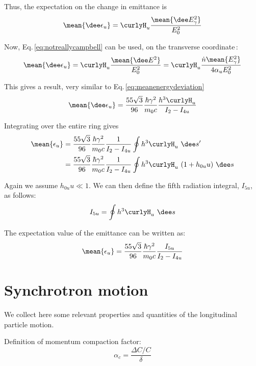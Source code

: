 Thus, the expectation on the change in emittance is
\begin{equation}
    \mean{\dee \epsilon_u} = \curlyH_u \frac{\mean{\dee E_\gamma^2}}{E_0^2}
\end{equation}

Now, Eq.\,\ref{eq:notreallycampbell} can be used, on the transverse coordinate\,\cite{hofmann_2004}:
\begin{equation}
    \mean{\dee \epsilon_u} = \curlyH_u \frac{\mean{\dee E^2}}{E_0^2}
    = \curlyH_u \frac{\dot{n} \mean{E_\gamma^2}}{4 \alpha_u E_0^2}
\end{equation}

This gives a result, very similar to Eq.\,\ref{eq:meanenergydeviation}
\begin{equation}
\mean{\dee \epsilon_u} = \frac{55 \sqrt{3}}{96} \frac{\hbar \gamma^2}{m_0 c} \frac{h^3 \curlyH_u}{I_2 - I_{4u}}
\end{equation}

Integrating over the entire ring gives
\begin{align}
    \mean{\epsilon_u} &= \frac{55 \sqrt{3}}{96} \frac{\hbar \gamma^2}{m_0 c}
    \frac{1}{I_2 - I_{4u}}\oint h^3 \curlyH_u\ \dee s'\notag\\
    &= \frac{55 \sqrt{3}}{96} \frac{\hbar \gamma^2}{m_0 c}
    \frac{1}{I_2 - I_{4u}}\oint h^3 \curlyH_u\ (1 + h_{0u}u)\ \dee s
\end{align}

Again we assume $h_{0u} u \ll 1$. We can then define the fifth radiation integral, $I_{5u}$, as follows:
\begin{equation}
    I_{5u} = \oint h^3 \curlyH_u\ \dee s
\end{equation}

The expectation value of the emittance can be written as:
\begin{equation}
    \mean{\epsilon_u} = \frac{55 \sqrt{3}}{96} \frac{\hbar \gamma^2}{m_0 c} \frac{I_{5u}}{I_2 - I_{4u}}
\end{equation}


\chapter{Synchrotron motion}
\label{ch:synchmon}

We collect here some relevant properties and quantities of the longitudinal particle motion.

Definition of momentum compaction factor:
\begin{equation}
\alpha_c = 
\frac{\Delta C/C}\delta
\end{equation}

